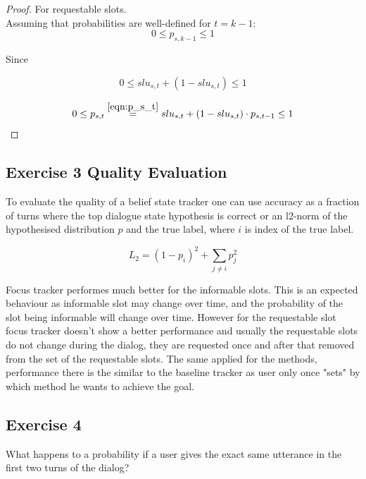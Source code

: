 \documentclass[12pt,titlepage,a4paper]{article}
\begin{document}
\begin{proof}
    For requestable slots.\\
    
    Assuming that probabilities are well-defined for $t = k-1$:
    \begin{equation}
        0 \leq p_{s,k-1} \leq 1
    \end{equation}
    
    Since
    
    \begin{equation}
        0 \leq slu_{s,t} + (1 - slu_{s,t}) \leq 1
    \end{equation}

    \begin{equation}
        0 \leq p_{s,t} \overset{\ref{eqn:p_s_t}}{=} slu_{s,t} + (1 - slu_{s,t}) \cdot p_{s,t-1} \leq 1
    \end{equation}
\end{proof}

\subsection{Exercise 3 Quality Evaluation}
To evaluate the quality of a belief state tracker one can use accuracy as a fraction of turns where the top dialogue state hypothesis is correct or an l2-norm of the hypothesised distribution $p$ and the true label, where $i$ is index of the true label. 
\begin{center}
    \begin{equation}
        L_2 = (1-p_i)^2 + \sum_{j \neq i} p_j^2
    \end{equation}
\end{center}
Focus tracker performes much better for the informable slots. This is an expected behaviour as informable slot may change over time, and the probabi\-lity of the slot being informable will change over time. However for the requestable slot focus tracker doesn't show a better performance and usually the requestable slots do not change during the dialog, they are requested once and after that removed from the set of the requestable slots. The same applied for the methods, performance there is the similar to the baseline tracker as user only once "sets" by which method he wants to achieve the goal.

\subsection{Exercise 4}
What happens to a probability if a user gives the exact same utterance in
the first two turns of the dialog?
\end{document}
